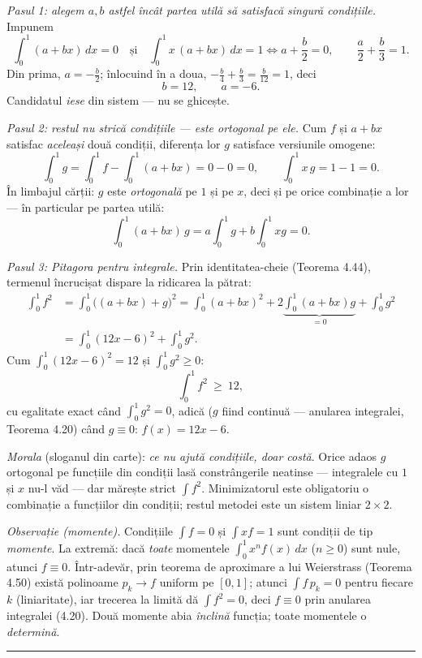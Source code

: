 \emph{Pasul 1: alegem $a,b$ astfel încât partea utilă să satisfacă singură condițiile.} Impunem
\[ \int_0^1(a+bx)\,dx=0\quad\text{și}\quad\int_0^1x\,(a+bx)\,dx=1 \Longleftrightarrow a+\frac b2=0,\qquad \frac a2+\frac b3=1 . \]
Din prima, $a=-\frac b2$; înlocuind în a doua, $-\frac b4+\frac b3=\frac{b}{12}=1$, deci
\[ b=12,\qquad a=-6 . \]
Candidatul \emph{iese} din sistem --- nu se ghicește.

\emph{Pasul 2: restul nu strică condițiile --- este ortogonal pe ele.} Cum $f$ și $a+bx$ satisfac \emph{aceleași} două condiții, diferența lor $g$ satisface versiunile omogene:
\[ \int_0^1 g=\int_0^1f-\int_0^1(a+bx)=0-0=0,\qquad \int_0^1x\,g=1-1=0 . \]
În limbajul cărții: $g$ este \emph{ortogonală} pe $1$ și pe $x$, deci și pe orice combinație a lor --- în particular pe partea utilă:
\[ \int_0^1(a+bx)\,g=a\int_0^1g+b\int_0^1xg=0 . \]

\emph{Pasul 3: Pitagora pentru integrale.} Prin identitatea-cheie (Teorema 4.44), termenul încrucișat dispare la ridicarea la pătrat:
\[ \begin{aligned} \int_0^1f^2&=\int_0^1\bigl((a+bx)+g\bigr)^2=\int_0^1(a+bx)^2+2\underbrace{\int_0^1(a+bx)g}_{=0}+\int_0^1g^2\\ &=\int_0^1(12x-6)^2+\int_0^1g^2 . \end{aligned} \]
Cum $\int_0^1(12x-6)^2=12$ și $\int_0^1g^2\ge0$:
\[ \int_0^1f^2\ \ge\ 12 , \]
cu egalitate exact când $\int_0^1g^2=0$, adică ($g$ fiind continuă --- anularea integralei, Teorema 4.20) când $g\equiv0$: $f(x)=12x-6$.

\emph{Morala} (sloganul din carte): \emph{ce nu ajută condițiile, doar costă}. Orice adaos $g$ ortogonal pe funcțiile din condiții lasă constrângerile neatinse --- integralele cu $1$ și $x$ nu-l văd --- dar mărește strict $\int f^{2}$. Minimizatorul este obligatoriu o combinație a funcțiilor din condiții; restul metodei este un sistem liniar $2\times2$.

\emph{Observație (momente).} Condițiile $\int f=0$ și $\int xf=1$ sunt condiții de tip \emph{momente}. La extremă: dacă \emph{toate} momentele $\int_{0}^{1}x^{n}f(x)\,dx$ ($n\ge0$) sunt nule, atunci $f\equiv0$. Într-adevăr, prin teorema de aproximare a lui Weierstrass (Teorema 4.50) există polinoame $p_{k}\to f$ uniform pe $[0,1]$; atunci $\int f\,p_{k}=0$ pentru fiecare $k$ (liniaritate), iar trecerea la limită dă $\int f^{2}=0$, deci $f\equiv0$ prin anularea integralei (4.20). Două momente abia \emph{înclină} funcția; toate momentele o \emph{determină}.
\vspace{1mm}\hrule

